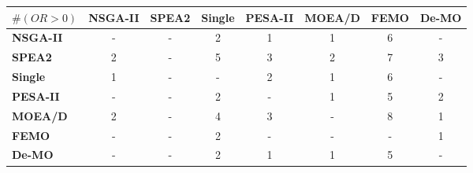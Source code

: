 \begin{tabular}{ l | c c c c c c c}
\hline 
\textbf{$\#(OR > 0)$}&\textbf{NSGA-II}&\textbf{SPEA2}&\textbf{Single}&\textbf{PESA-II}&\textbf{MOEA/D}&\textbf{FEMO}&\textbf{De-MO} \\ 
\hline 
\textbf{NSGA-II}&-&-&2&1&1&6&-\\ 
\textbf{SPEA2}&2&-&5&3&2&7&3\\ 
\textbf{Single}&1&-&-&2&1&6&-\\ 
\textbf{PESA-II}&-&-&2&-&1&5&2\\ 
\textbf{MOEA/D}&2&-&4&3&-&8&1\\ 
\textbf{FEMO}&-&-&2&-&-&-&1\\ 
\textbf{De-MO}&-&-&2&1&1&5&-\\ 
\hline
\end{tabular} 